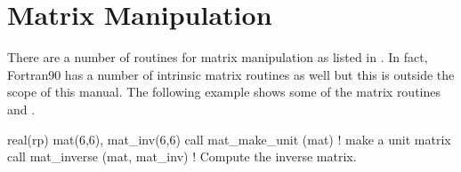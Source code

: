 \section{Matrix Manipulation}
\label{s:matrix}

There are a number of \bmad routines for matrix manipulation as listed
in . In fact, Fortran90 has a number of intrinsic matrix
routines as well but this is outside the scope of this manual. The
following example shows some of the \bmad matrix routines
 and 
.
\begin{example}
  real(rp) mat(6,6), mat_inv(6,6)
  call mat_make_unit (mat)    ! make a unit matrix
  call mat_inverse (mat, mat_inv) ! Compute the inverse matrix.
\end{example}
